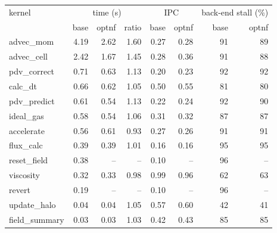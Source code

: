 \begin{tabular}{lrrrrrrr}
\toprule
kernel & \multicolumn{3}{c}{time (s)} & \multicolumn{2}{c}{IPC} & \multicolumn{2}{c}{back-end stall (\%)} \\
 & base & optnf & ratio & base & optnf & base & optnf \\
\midrule
advec\_mom & 4.19 & 2.62 & 1.60 & 0.27 & 0.28 & 91 & 89 \\
advec\_cell & 2.42 & 1.67 & 1.45 & 0.28 & 0.36 & 91 & 88 \\
pdv\_correct & 0.71 & 0.63 & 1.13 & 0.20 & 0.23 & 92 & 92 \\
calc\_dt & 0.66 & 0.62 & 1.05 & 0.50 & 0.55 & 81 & 80 \\
pdv\_predict & 0.61 & 0.54 & 1.13 & 0.22 & 0.24 & 92 & 90 \\
ideal\_gas & 0.58 & 0.54 & 1.06 & 0.31 & 0.32 & 87 & 87 \\
accelerate & 0.56 & 0.61 & 0.93 & 0.27 & 0.26 & 91 & 91 \\
flux\_calc & 0.39 & 0.39 & 1.01 & 0.16 & 0.16 & 95 & 95 \\
reset\_field & 0.38 & -- & -- & 0.10 & -- & 96 & -- \\
viscosity & 0.32 & 0.33 & 0.98 & 0.99 & 0.96 & 62 & 63 \\
revert & 0.19 & -- & -- & 0.10 & -- & 96 & -- \\
update\_halo & 0.04 & 0.04 & 1.05 & 0.57 & 0.60 & 42 & 41 \\
field\_summary & 0.03 & 0.03 & 1.03 & 0.42 & 0.43 & 85 & 85 \\
\bottomrule
\end{tabular}

